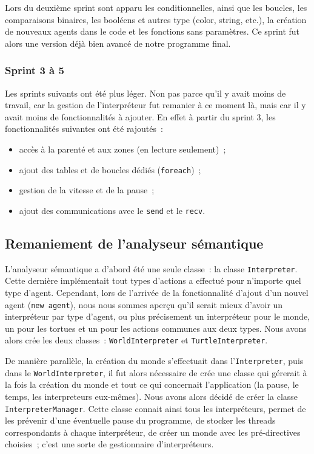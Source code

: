 Lors du deuxième sprint sont apparu les conditionnelles, ainsi que les boucles, les comparaisons binaires, les booléens et autres type (color, string, etc.), la création de nouveaux agents dans le code et les fonctions sans paramètres. Ce sprint fut alors une version déjà bien avancé de notre programme final.


\subsubsection{Sprint 3 à 5}
Les sprints suivants ont été plus léger. Non pas parce qu'il y avait moins de travail, car la gestion de l'interpréteur fut remanier à ce moment là, mais car il y avait moins de fonctionnalités à ajouter. En effet à partir du sprint 3, les fonctionnalités suivantes ont été rajoutés~:
\begin{itemize}
\item accès à la parenté et aux zones (en lecture seulement)~;
\item ajout des tables et de boucles dédiés (\verb|foreach|)~;
\item gestion de la vitesse et de la pause~;
\item ajout des communications avec le \verb|send| et le \verb|recv|.
\end{itemize}


\subsection{Remaniement de l'analyseur sémantique}
\label{remaniementInterpreter}

L'analyseur sémantique a d'abord été une seule classe~: la classe \verb|Interpreter|.
Cette dernière implémentait tout types d'actions a effectué pour n'importe quel type d'agent.
Cependant, lors de l'arrivée de la fonctionnalité d'ajout d'un nouvel agent (\verb|new agent|), nous nous sommes aperçu qu'il serait mieux d'avoir un interpréteur par type d'agent, ou plus précisement un interpréteur pour le monde, un pour les tortues et un pour les actions communes aux deux types.
Nous avons alors crée les deux classes~: \verb|WorldInterpreter| et \verb|TurtleInterpreter|.

De manière parallèle, la création du monde s'effectuait dans l'\verb|Interpreter|, puis dans le \verb|WorldInterpreter|, il fut alors nécessaire de crée une classe qui gérerait à la fois la création du monde et tout ce qui concernait l'application (la pause, le temps, les interpreteurs eux-mêmes). Nous avons alors décidé de créer la classe \verb|InterpreterManager|.
Cette classe connait ainsi tous les interpréteurs, permet de les prévenir d'une éventuelle pause du programme, de stocker les threads correspondants à chaque interpréteur, de créer un monde avec les pré-directives choisies~; c'est une sorte de gestionnaire d'interpréteurs.
